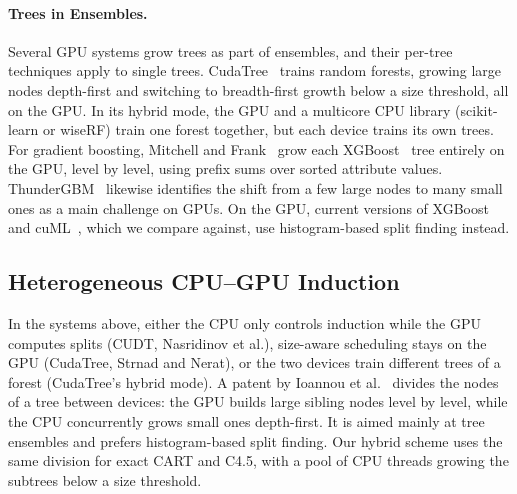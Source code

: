 \paragraph{Trees in Ensembles.} Several GPU systems grow trees as part of ensembles, and their per-tree techniques apply to single trees. CudaTree~\cite{liao2013cudatree} trains random forests, growing large nodes depth-first and switching to breadth-first growth below a size threshold, all on the GPU. In its hybrid mode, the GPU and a multicore CPU library (scikit-learn or wiseRF) train one forest together, but each device trains its own trees.  For gradient boosting, Mitchell and Frank~\cite{mitchell2017xgboostgpu} grow each XGBoost~\cite{chen2016xgboost} tree entirely on the GPU, level by level, using prefix sums over sorted attribute values. ThunderGBM~\cite{wen2019thundergbm} likewise identifies the shift from a few large nodes to many small ones as a main challenge on GPUs. On the GPU, current versions of XGBoost and cuML~\cite{raschka2020cuml}, which we compare against, use histogram-based split finding instead.

\subsection{Heterogeneous CPU--GPU Induction}

In the systems above, either the CPU only controls induction while the GPU computes splits (CUDT, Nasridinov et al.), size-aware scheduling stays on the GPU (CudaTree, Strnad and Nerat), or the two devices train different trees of a forest (CudaTree's hybrid mode). A patent by Ioannou et al.~\cite{ioannou2025patent} divides the nodes of a tree between devices: the GPU builds large sibling nodes level by level, while the CPU concurrently grows small ones depth-first. It is aimed mainly at tree ensembles and prefers histogram-based split finding. Our hybrid scheme uses the same division for exact CART and C4.5, with a pool of CPU threads growing the subtrees below a size threshold.
